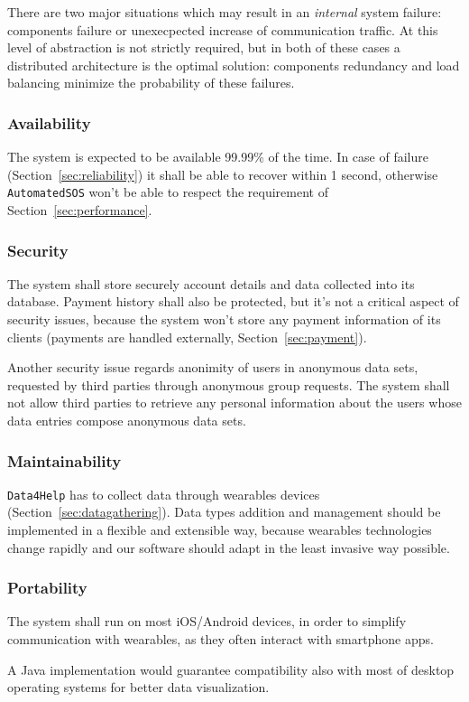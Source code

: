       There are two major situations which may result in an \textit{internal} system failure: components failure or unexecpected increase of communication traffic. At this level of abstraction is not strictly required, but in both of these cases a distributed architecture is the optimal solution: components redundancy and load balancing minimize the probability of these failures.

    \subsubsection{Availability}

      The system is expected to be available 99.99\% of the time. In case of failure (Section~\ref{sec:reliability}) it shall be able to recover within 1 second, otherwise \texttt{AutomatedSOS} won't be able to respect the requirement of Section~\ref{sec:performance}.

    \subsubsection{Security}

      The system shall store securely account details and data collected into its database. Payment history shall also be protected, but it's not a critical aspect of security issues, because the system won't store any payment information of its clients (payments are handled externally, Section~\ref{sec:payment}).

      Another security issue regards anonimity of users in anonymous data sets, requested by third parties through anonymous group requests. The system shall not allow third parties to retrieve any personal information about the users whose data entries compose anonymous data sets.

    \subsubsection{Maintainability}

      \texttt{Data4Help} has to collect data through wearables devices (Section~\ref{sec:datagathering}). Data types addition and management should be implemented in a flexible and extensible way, because wearables technologies change rapidly and our software should adapt in the least invasive way possible.

    \subsubsection{Portability}

      The system shall run on most iOS/Android devices, in order to simplify communication with wearables, as they often interact with smartphone apps.

      A Java implementation would guarantee compatibility also with most of desktop operating systems for better data visualization.

